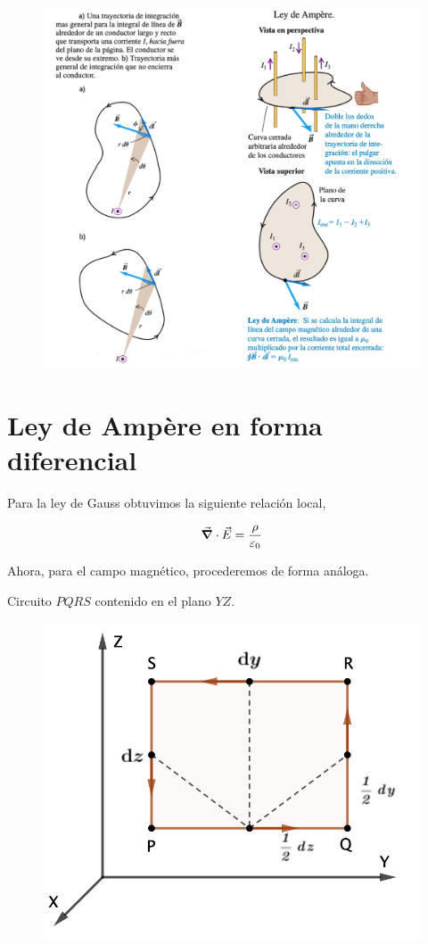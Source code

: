 \begin{figure}[H]
	\centering
	\includegraphics[width=.8\textwidth]{imagenes/imagenes27/T27IM06.png}
\end{figure}


\section{Ley de Ampère en forma diferencial}

\begin{multicols}{2}
Para la ley de Gauss obtuvimos la siguiente relación local, 

$$ \vec \grad  \cdot \vec E = \dfrac{\rho}{\varepsilon_0}$$ 

Ahora, para el campo magnético, procederemos de forma análoga.


Circuito $PQRS$ contenido en el plano $YZ$.
\begin{figure}[H]
	\centering
	\includegraphics[width=.5\textwidth]{imagenes/imagenes27/T27IM08.png}
\end{figure}	
\end{multicols}

